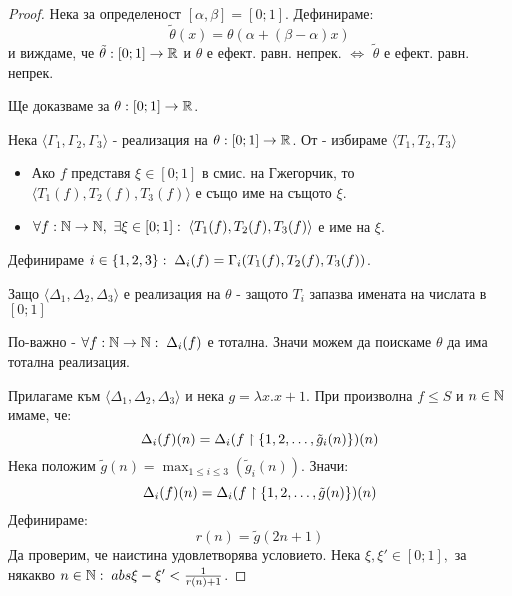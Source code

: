 \begin{proof}
    Нека за определеност $[\alpha, \beta] = [0; 1]$. Дефинираме:
    \begin{equation}
        \tilde \theta(x) = \theta(\alpha + (\beta - \alpha)x)
    \end{equation}
    и виждаме, че $\tilde \theta : [0; 1] \to {\mathbb{R}}$ и $\theta$ е ефект. равн. непрек. $\iff$ $\tilde \theta$ е ефект. равн. непрек.

    Ще доказваме за $\theta : [0; 1] \to {\mathbb{R}}$.

    Нека $\langle \Gamma_1, \Gamma_2, \Gamma_3 \rangle$ - реализация на $\theta : [0; 1] \to {\mathbb{R}}$. От  - избираме $\langle T_1, T_2, T_3 \rangle$
    \begin{itemize}
        \item Ако $f$ представя $\xi \in [0; 1]$ в смис. на Гжегорчик, то $\langle T_1(f), T_2(f), T_3(f) \rangle$ е също име на същото $\xi$.
        \item $\forall f: {\mathbb{N}} \to {\mathbb{N}},\ \exists \xi \in [0; 1]:\; \langle T_1(f), T_2(f), T_3(f) \rangle$ е име на $\xi$.
    \end{itemize}
    Дефинираме $i \in \left\{1, 2, 3\right\}:\; \Delta_i(f) = \Gamma_i(T_1(f), T_2(f), T_3(f))$.

    Защо $\langle \Delta_1, \Delta_2, \Delta_3 \rangle$ е реализация на $\theta$ - защото $T_i$ запазва имената на числата в $[0; 1]$

    По-важно - $\forall f: {\mathbb{N}} \to {\mathbb{N}}:\; \Delta_i(f)$ е тотална. Значи можем да поискаме $\theta$ да има тотална реализация.

    Прилагаме  към $\langle \Delta_1, \Delta_2, \Delta_3 \rangle$ и нека $g = \lambda x. x+1$. При произволна $f \leq S$ и $n \in {\mathbb{N}}$ имаме, че:
    \begin{equation}
        \Delta_i(f)(n) = \Delta_i(f \upharpoonright \left\{1, 2, \dots, \tilde g_i(n)\right\})(n)
    \end{equation}
    Нека положим $\tilde g(n) = \max_{1 \leq i \leq 3} (\tilde g_i(n))$. Значи:
    \begin{equation}
        \Delta_i(f)(n) = \Delta_i(f \upharpoonright \left\{1, 2, \dots, \tilde g(n)\right\})(n)
    \end{equation}
    Дефинираме:
    \begin{equation}
        r(n) = \tilde g(2n + 1)
    \end{equation}
    Да проверим, че наистина удовлетворява условието. Нека $\xi, \xi' \in [0; 1], $ за някакво $n \in {\mathbb{N}}:\; abs{\xi - \xi'} < \frac{1}{r(n) + 1}$.


\end{proof}
